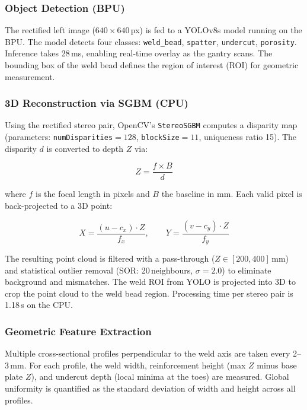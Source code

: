 \documentclass[12pt,a4paper]{article}
\begin{document}
\subsubsection{Object Detection (BPU)}
The rectified left image ($640\times640$\,px) is fed to a YOLOv8s model running on the BPU. The model detects
four classes: \texttt{weld\_bead}, \texttt{spatter}, \texttt{undercut}, \texttt{porosity}. Inference takes
28\,ms, enabling real-time overlay as the gantry scans. The bounding box of the weld bead defines the region
of interest (ROI) for geometric measurement.

\subsubsection{3D Reconstruction via SGBM (CPU)}
Using the rectified stereo pair, OpenCV's \texttt{StereoSGBM} computes a disparity map (parameters:
\texttt{numDisparities}$=128$, \texttt{blockSize}$=11$, uniqueness ratio 15). The disparity $d$ is
converted to depth $Z$ via:

\begin{equation}
  Z = \frac{f \times B}{d}
  \label{eq:depth}
\end{equation}

\noindent where $f$ is the focal length in pixels and $B$ the baseline in mm. Each valid pixel is
back-projected to a 3D point:

\begin{equation}
  X = \frac{(u - c_x)\cdot Z}{f_x}, \qquad Y = \frac{(v - c_y)\cdot Z}{f_y}
  \label{eq:backproject}
\end{equation}

The resulting point cloud is filtered with a pass-through ($Z \in [200, 400]$\,mm) and statistical outlier
removal (SOR: 20\,neighbours, $\sigma=2.0$) to eliminate background and mismatches. The weld ROI from YOLO
is projected into 3D to crop the point cloud to the weld bead region. Processing time per stereo pair is
1.18\,s on the CPU.

\subsubsection{Geometric Feature Extraction}
Multiple cross-sectional profiles perpendicular to the weld axis are taken every 2--3\,mm. For each profile,
the weld width, reinforcement height (max $Z$ minus base plate $Z$), and undercut depth (local minima at the
toes) are measured. Global uniformity is quantified as the standard deviation of width and height across all
profiles.
\end{document}
